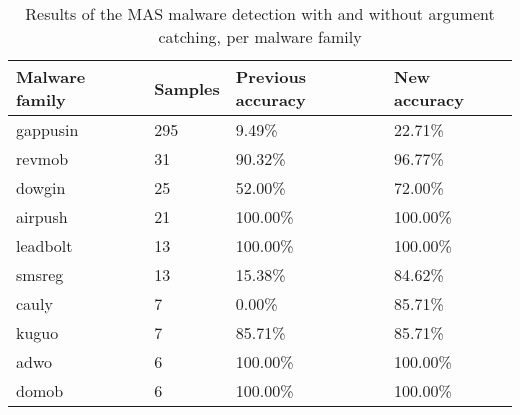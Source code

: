 \begin{table}[]
\fontsize{12pt}{12pt}\selectfont
\centering
\caption{Results of the MAS malware detection with and without argument catching, per malware family}
\label{tab:per-family-results}
\begin{tabular}{|l|l|l|l|}
\hline
\textbf{Malware family} & \textbf{Samples} & \textbf{Previous accuracy} & \textbf{New accuracy} \\ \hline
gappusin                                 & 295                               & 9.49\%                                      & 22.71\%                                \\ \hline
revmob                                   & 31                                & 90.32\%                                     & 96.77\%                                \\ \hline
dowgin                                   & 25                                & 52.00\%                                     & 72.00\%                                \\ \hline
airpush                                  & 21                                & 100.00\%                                    & 100.00\%                               \\ \hline
leadbolt                                 & 13                                & 100.00\%                                    & 100.00\%                               \\ \hline
smsreg                                   & 13                                & 15.38\%                                     & 84.62\%                                \\ \hline
cauly                                    & 7                                 & 0.00\%                                      & 85.71\%                                \\ \hline
kuguo                                    & 7                                 & 85.71\%                                     & 85.71\%                                \\ \hline
adwo                                     & 6                                 & 100.00\%                                    & 100.00\%                               \\ \hline
domob                                    & 6                                 & 100.00\%                                    & 100.00\%                               \\ \hline

\end{tabular}
\end{table}
